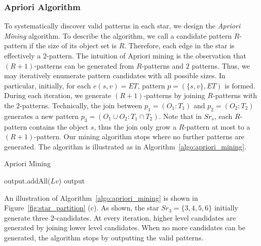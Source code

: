 \subsubsection{Apriori Algorithm}

To systematically discover valid patterns in each star, 
we design the \emph{Apriori Mining} algorithm. 
To describe the  algorithm, we call a candidate pattern $R$-pattern 
if the size of its object set is $R$.  Therefore, each edge
in the star is effectively a $2$-pattern. The intuition of Apriori mining
is the observation that $(R+1)$-patterns can be generated
from $R$-patterns and $2$ patterns. Thus, we may iteratively 
enumerate pattern candidates with all possible sizes.
In particular, initially, for each $e(s,v)=ET$, pattern $p=(\{s,v\}, ET)$ is formed. 
During each iteration, we generate $(R+1)$-patterns by joining $R$-patterns 
with the $2$-patterns. Technically, the join between $p_1=(O_1:T_1)$ and $p_2=(O_2:T_2)$
generates a new pattern $p_3=(O_1 \cup O_2:T_1 \cap T_2)$. Note that in $Sr_s$,
each $R$-pattern contains the object $s$, thus the join only 
grow a $R$-pattern at most to a $(R+1)$-pattern.
Our mining algorithm stops where no further patterns are generated. 
The algorithm is illustrated as in Algorithm~\ref{algo:apriori_mining}.

\begin{algorithm}
\caption{Apriori Mining}
\label{algo:apriori_mining}
\begin{algorithmic}[1]
 
\EndFor
{}
		 
			 
		\EndIf
\EndWhile
\State output.addAll($Lv$)
\State \Return output
\end{algorithmic}
\end{algorithm}
 
An illustration of Algorithm~\ref{algo:apriori_mining} is shown in Figure~\ref{fig:star_partition} (c).
As shown, the star $Sr_3=\{3,4,5,6\}$ initially generate three $2$-candidates. At every iteration, 
higher level candidates are generated by joining lower level candidates. When no more candidates 
can be generated, the algorithm stops by outputting the valid patterns.
%





